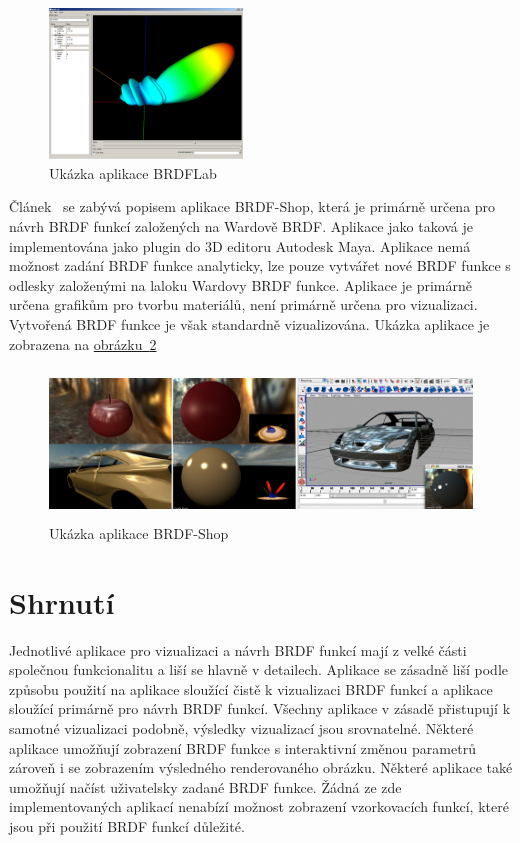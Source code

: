 \documentclass[czech,master]{diploma}
\begin{document}
\begin{figure}[ht]
  \centering
  \includegraphics[height=4cm]{Figures/brdflab.png}
  \caption{Ukázka aplikace BRDFLab~\cite{Fors2009BRDFLabAG}}%
  \label{fig:brdflabApp}%
\end{figure}

Článek~\cite{brdfshop} se zabývá popisem aplikace BRDF-Shop, která je primárně určena pro návrh BRDF funkcí založených na Wardově BRDF\@. Aplikace jako taková je implementována jako plugin do 3D editoru Autodesk Maya. Aplikace nemá možnost zadání BRDF funkce analyticky, lze pouze vytvářet nové BRDF funkce s odlesky založenými na laloku Wardovy BRDF funkce. Aplikace je primárně určena grafikům pro tvorbu materiálů, není primárně určena pro vizualizaci. Vytvořená BRDF funkce je však standardně vizualizována. Ukázka aplikace je zobrazena na \hyperref[fig:brdflabApp]{obrázku~\ref{fig:brdfshopapp}}

\begin{figure}[ht]
  \centering
  \includegraphics[height=4cm]{Figures/BRDFShop.jpg}
  \caption{Ukázka aplikace BRDF-Shop}%
  \label{fig:brdfshopapp}%
\end{figure}

\section{Shrnutí}
Jednotlivé aplikace pro vizualizaci a návrh BRDF funkcí mají z velké části společnou funkcionalitu a liší se hlavně v detailech. Aplikace se zásadně liší podle způsobu použití na aplikace sloužící čistě k vizualizaci BRDF funkcí a aplikace sloužící primárně pro návrh BRDF funkcí. Všechny aplikace v zásadě přistupují k samotné vizualizaci podobně, výsledky vizualizací jsou srovnatelné. Některé aplikace umožňují zobrazení BRDF funkce s interaktivní změnou parametrů zároveň i se zobrazením výsledného renderovaného obrázku. Některé aplikace také umožňují načíst uživatelsky zadané BRDF funkce. Žádná ze zde implementovaných aplikací nenabízí možnost zobrazení vzorkovacích funkcí, které jsou při použití BRDF funkcí důležité.
\end{document}

